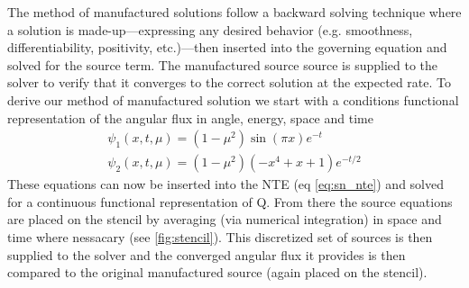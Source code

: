 
The method of manufactured solutions follow a backward solving technique where a solution is made-up---expressing any desired behavior (e.g. smoothness, differentiability, positivity, etc.)---then inserted into the governing equation and solved for the source term.
The manufactured source source is supplied to the solver to verify that it converges to the correct solution at the expected rate. 
To derive our method of manufactured solution we start with a conditions functional representation of the angular flux in angle, energy, space and time 
\begin{subequations}
    \label{eq:manufactured_sol}  
    \begin{align}
        \psi_1(x,t,\mu) = (1-\mu^2)\sin(\pi x)e^{-t} \label{eq:af_mms_cont1}\\
        \psi_2(x,t,\mu) = (1-\mu^2)(-x^4 + x + 1)e^{-t/2} \label{eq:af_mms_cont2}
    \end{align}
\end{subequations} 
These equations can now be inserted into the NTE (eq \ref{eq:sn_nte}) and solved for a continuous functional representation of Q.
From there the source equations are placed on the stencil by averaging (via numerical integration) in space and time where nessacary (see \ref{fig:stencil}).
This discretized set of sources is then supplied to the solver and the converged angular flux it provides is then compared to the original manufactured source (again placed on the stencil).
